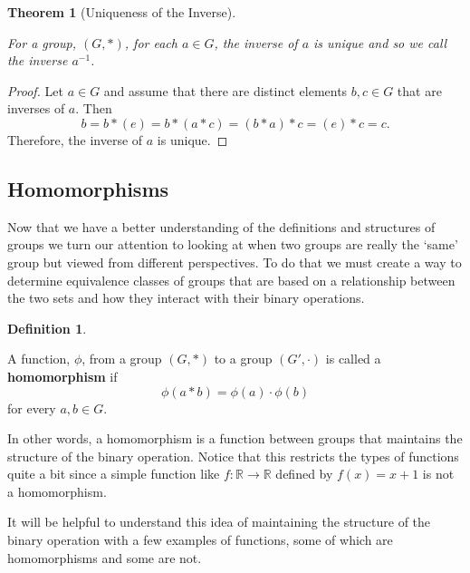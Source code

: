 \documentclass[
]{book}
\newtheorem{theorem}{Theorem}[chapter]
\theoremstyle{definition}
\newtheorem{definition}{Definition}[chapter]
\theoremstyle{definition}
\theoremstyle{definition}
\theoremstyle{definition}
\theoremstyle{remark}
\begin{document}
\begin{theorem}[Uniqueness of the Inverse]
\protect\hypertarget{thm:unique-inverse}{}\label{thm:unique-inverse}

For a group, \((G,*)\), for each \(a\in G\), the inverse of \(a\) is unique and so we call the inverse \(a^{-1}\).

\end{theorem}

\begin{proof}

Let \(a\in G\) and assume that there are distinct elements \(b,c \in G\) that are inverses of \(a\). Then \[b= b * (e)= b* (a*c)= (b*a)*c = (e)*c = c.\] Therefore, the inverse of \(a\) is unique.

\end{proof}

\hypertarget{sec:homomorphisms}{%
\subsection{Homomorphisms}\label{sec:homomorphisms}}

Now that we have a better understanding of the definitions and structures of groups we turn our attention to looking at when two groups are really the `same' group but viewed from different perspectives. To do that we must create a way to determine equivalence classes of groups that are based on a relationship between the two sets and how they interact with their binary operations.

\begin{definition}
\protect\hypertarget{def:unlabeled-div-81}{}\label{def:unlabeled-div-81}

A function, \(\phi\), from a group \((G,*)\) to a group \((G',\cdot)\) is called a \textbf{homomorphism} if \[\phi(a*b)=\phi(a) \cdot \phi(b)\] for every \(a,b\in G\).

\end{definition}

In other words, a homomorphism is a function between groups that maintains the structure of the binary operation. Notice that this restricts the types of functions quite a bit since a simple function like \(f:\mathbb{R} \rightarrow \mathbb{R}\) defined by \(f(x)=x+1\) is not a homomorphism.

It will be helpful to understand this idea of maintaining the structure of the binary operation with a few examples of functions, some of which are homomorphisms and some are not.
\end{document}
